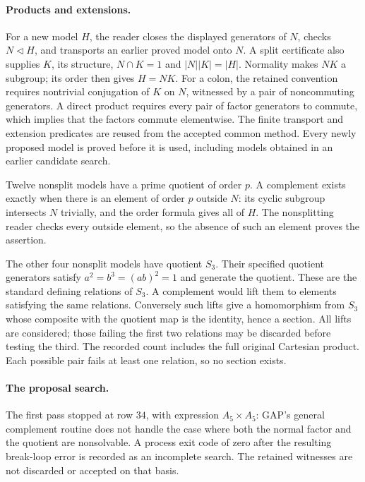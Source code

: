 \documentclass[11pt]{article}
\begin{document}
\paragraph{Products and extensions.}
For a new model $H$, the reader closes the displayed generators of $N$,
checks $N\triangleleft H$, and transports an earlier proved model onto
$N$. A split certificate also supplies $K$, its structure,
$N\cap K=1$ and $|N||K|=|H|$. Normality makes $NK$ a subgroup;
its order then gives $H=NK$. For a colon, the retained convention
requires nontrivial conjugation of $K$ on $N$, witnessed by a pair of
noncommuting generators. A direct product requires every pair of factor
generators to commute, which implies that the factors commute elementwise.
The finite transport and extension predicates are reused from the
accepted common method. Every newly proposed model is proved before it
is used, including models obtained in an earlier candidate search.

Twelve nonsplit models have a prime quotient of order $p$. A complement
exists exactly when there is an element of order $p$ outside $N$: its
cyclic subgroup intersects $N$ trivially, and the order formula gives all
of $H$. The nonsplitting reader checks every outside element, so the
absence of such an element proves the assertion.

The other four nonsplit models have quotient $S_3$. Their specified
quotient generators satisfy $a^2=b^3=(ab)^2=1$ and generate the quotient.
These are the standard defining relations of $S_3$. A complement would
lift them to elements satisfying the same relations. Conversely such
lifts give a homomorphism from $S_3$ whose composite with the quotient
map is the identity, hence a section. All lifts are considered; those
failing the first two relations may be discarded before testing the
third. The recorded count includes the full original Cartesian product.
Each possible pair fails at least one relation, so no section exists.

\paragraph{The proposal search.}
The first pass stopped at row $34$, with expression $A_5\times A_5$:
GAP's general complement routine does not handle the case where both the
normal factor and the quotient are nonsolvable. A process exit code of
zero after the resulting break-loop error is recorded as an incomplete
search. The retained witnesses are not discarded or accepted on that basis.
\end{document}
